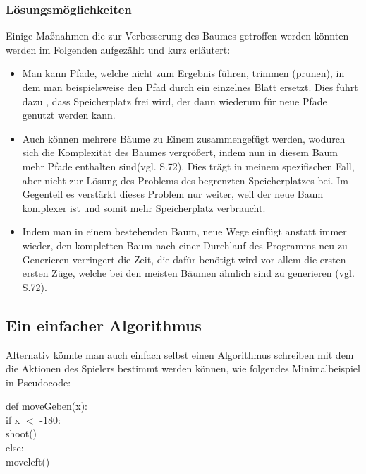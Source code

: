\subsubsection{Lösungsmöglichkeiten}
Einige Maßnahmen die zur Verbesserung des Baumes getroffen werden könnten werden im Folgenden aufgezählt und kurz erläutert:\\
	\begin{itemize}
	\item Man kann Pfade, welche nicht zum Ergebnis führen, trimmen (prunen), in dem man beispielsweise den Pfad durch ein einzelnes Blatt ersetzt. Dies führt dazu , dass Speicherplatz frei wird, der dann wiederum für neue Pfade genutzt werden kann.%
	\item Auch können mehrere Bäume zu Einem zusammengefügt werden, wodurch sich die Komplexität des Baumes vergrößert, indem nun in diesem Baum mehr Pfade enthalten sind(vgl. \citeauthor{quinlan} \citeyear{quinlan} S.72). Dies trägt in meinem spezifischen Fall, aber nicht zur Lösung des Problems des begrenzten Speicherplatzes bei. Im Gegenteil es verstärkt dieses Problem nur weiter, weil der neue Baum komplexer ist und somit mehr Speicherplatz verbraucht.
	\item Indem man in einem bestehenden Baum, neue Wege einfügt anstatt immer wieder, den kompletten Baum nach einer Durchlauf des Programms neu zu Generieren verringert die Zeit, die dafür benötigt wird vor allem die ersten ersten Züge, welche bei den meisten Bäumen ähnlich sind zu generieren (vgl. \citeauthor{quinlan} \citeyear{quinlan} S.72).
	\end{itemize} %
		  
\subsection{Ein einfacher Algorithmus}
Alternativ könnte man auch einfach selbst einen Algorithmus schreiben mit dem die Aktionen des Spielers bestimmt werden können, wie folgendes Minimalbeispiel in Pseudocode:\\
\begin{center}


 def moveGeben(x):\\
	\tab if x $<$ -180:\\
		\tab \tab  shoot()\\
	\tab else:\\
		\tab \tab  moveleft() \\
		\label{algor}
		\end{center}
